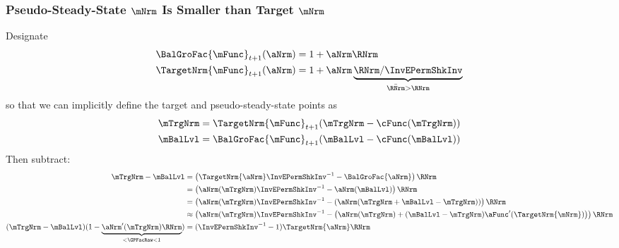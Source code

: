\documentclass[\econtexRoot/BufferStockTheory]{subfiles}
\begin{document}
\subsubsection{Pseudo-Steady-State \texorpdfstring{$\mNrm$}{m} Is Smaller than Target \texorpdfstring{$\mNrm$}{m}}
Designate
\begin{equation}\begin{split}
  \BalGroFac{\mFunc}_{t+1}(\aNrm) %
   & = 1+\aNrm\RNrm
\\  \TargetNrm{\mFunc}_{t+1}(\aNrm)%
 & = 1+\aNrm\underbrace{\RNrm/\InvEPermShkInv}_{\bar{\RNrm} > \RNrm}
\end{split}\end{equation}
so that we can implicitly define the target and pseudo-steady-state points as
\begin{equation}\begin{split}
  \mTrgNrm & =\TargetNrm{\mFunc}_{t+1}(\mTrgNrm-\cFunc(\mTrgNrm))
  \\ \mBalLvl & = \BalGroFac{\mFunc}_{t+1}(\mBalLvl-\cFunc(\mBalLvl))
\end{split}\end{equation}
Then subtract:
\begin{equation}\begin{split}
  \mTrgNrm - \mBalLvl %
 & = \left(\TargetNrm{\aNrm} \InvEPermShkInv^{-1} - \BalGroFac{\aNrm} \right)\RNrm 
\\ & = \left({\aNrm}(\mTrgNrm) \InvEPermShkInv^{-1} - {\aNrm}(\mBalLvl) \right)\RNrm 
\\ & = \left({\aNrm}(\mTrgNrm) \InvEPermShkInv^{-1} - \left({\aNrm}(\mTrgNrm+\mBalLvl-\mTrgNrm)\right) \right)\RNrm 
\\ & \approx \left({\aNrm}(\mTrgNrm) \InvEPermShkInv^{-1} - \left({\aNrm}(\mTrgNrm)+(\mBalLvl-\mTrgNrm)\aFunc^{\prime}(\TargetNrm{\mNrm})\right) \right)\RNrm 
  \\ (\mTrgNrm - \mBalLvl)(1-\underbrace{{\aNrm}^{\prime}(\mTrgNrm)\RNrm}_{< \GPFacRaw < 1}) & = (\InvEPermShkInv^{-1} - 1)\TargetNrm{\aNrm}\RNrm
\end{split}\end{equation}
\end{document}
